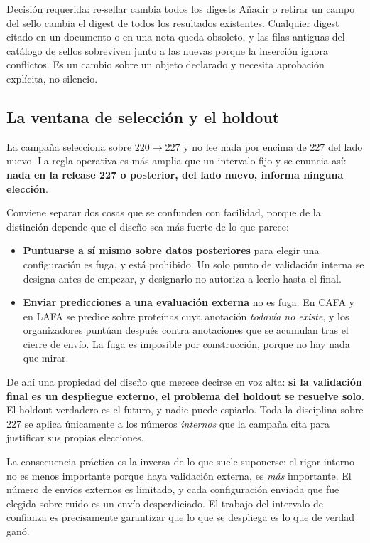 \begin{aviso}{Decisión requerida: re-sellar cambia todos los digests}
Añadir o retirar un campo del sello cambia el digest de todos los resultados
existentes. Cualquier digest citado en un documento o en una nota queda obsoleto,
y las filas antiguas del catálogo de sellos sobreviven junto a las nuevas porque
la inserción ignora conflictos. Es un cambio sobre un objeto declarado y necesita
aprobación explícita, no silencio.
\end{aviso}

\subsection{La ventana de selección y el holdout}

La campaña selecciona sobre $220 \rightarrow 227$ y no lee nada por encima de 227
del lado nuevo. La regla operativa es más amplia que un intervalo fijo y se
enuncia así: \textbf{nada en la release 227 o posterior, del lado nuevo, informa
ninguna elección}.

Conviene separar dos cosas que se confunden con facilidad, porque de la distinción
depende que el diseño sea más fuerte de lo que parece:

\begin{itemize}[leftmargin=1.4em,itemsep=0.3em]
  \item \textbf{Puntuarse a sí mismo sobre datos posteriores} para elegir una
        configuración es fuga, y está prohibido. Un solo punto de validación
        interna se designa antes de empezar, y designarlo no autoriza a leerlo
        hasta el final.
  \item \textbf{Enviar predicciones a una evaluación externa} no es fuga. En CAFA
        y en LAFA se predice sobre proteínas cuya anotación \emph{todavía no
        existe}, y los organizadores puntúan después contra anotaciones que se
        acumulan tras el cierre de envío. La fuga es imposible por construcción,
        porque no hay nada que mirar.
\end{itemize}

De ahí una propiedad del diseño que merece decirse en voz alta: \textbf{si la
validación final es un despliegue externo, el problema del holdout se resuelve
solo}. El holdout verdadero es el futuro, y nadie puede espiarlo. Toda la
disciplina sobre 227 se aplica únicamente a los números \emph{internos} que la
campaña cita para justificar sus propias elecciones.

La consecuencia práctica es la inversa de lo que suele suponerse: el rigor interno
no es menos importante porque haya validación externa, es \emph{más} importante.
El número de envíos externos es limitado, y cada configuración enviada que fue
elegida sobre ruido es un envío desperdiciado. El trabajo del intervalo de
confianza es precisamente garantizar que lo que se despliega es lo que de verdad
ganó.

